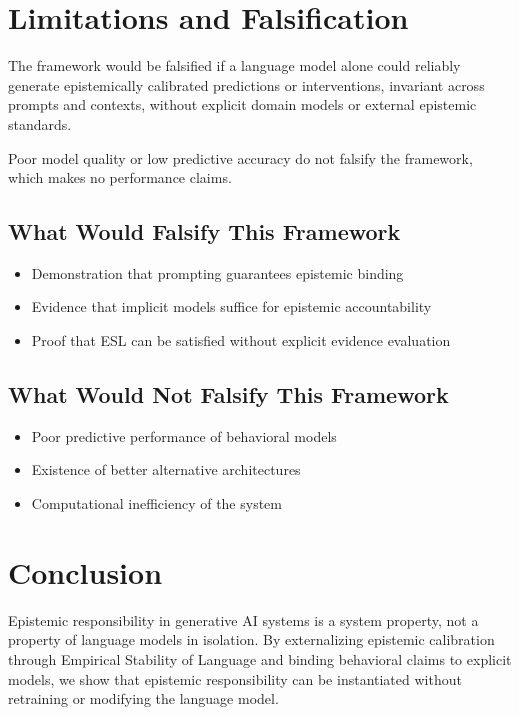 \documentclass[11pt,a4paper]{article}
\begin{document}
\section{Limitations and Falsification}

The framework would be falsified if a language model alone could reliably generate epistemically calibrated predictions or interventions, invariant across prompts and contexts, without explicit domain models or external epistemic standards.

Poor model quality or low predictive accuracy do not falsify the framework, which makes no performance claims.

\subsection{What Would Falsify This Framework}

\begin{itemize}
    \item Demonstration that prompting guarantees epistemic binding
    \item Evidence that implicit models suffice for epistemic accountability
    \item Proof that ESL can be satisfied without explicit evidence evaluation
\end{itemize}

\subsection{What Would Not Falsify This Framework}

\begin{itemize}
    \item Poor predictive performance of behavioral models
    \item Existence of better alternative architectures
    \item Computational inefficiency of the system
\end{itemize}


\section{Conclusion}

Epistemic responsibility in generative AI systems is a system property, not a property of language models in isolation. By externalizing epistemic calibration through Empirical Stability of Language and binding behavioral claims to explicit models, we show that epistemic responsibility can be instantiated without retraining or modifying the language model.
\end{document}
